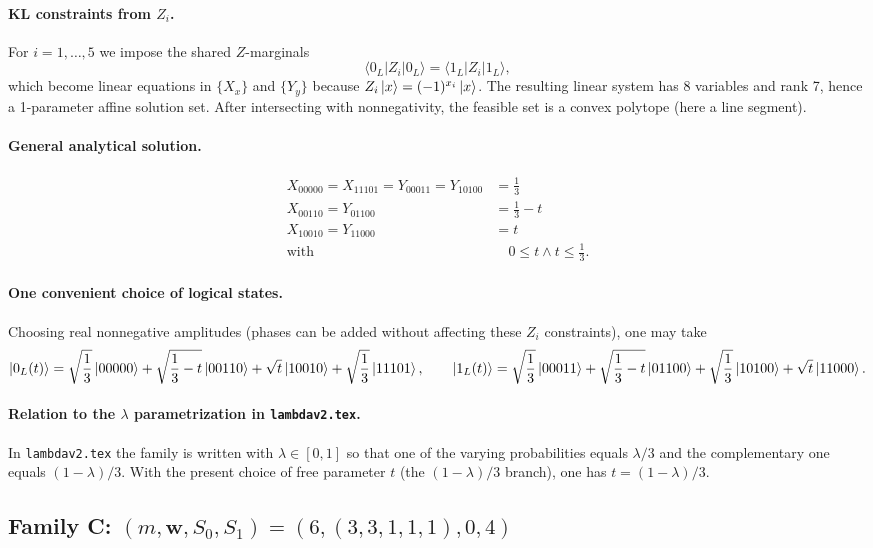 \documentclass[11pt]{article}
\begin{document}
\paragraph{KL constraints from $Z_i$.}
For $i=1,\dots,5$ we impose the shared $Z$-marginals
\[
\langle 0_L|Z_i|0_L\rangle=\langle 1_L|Z_i|1_L\rangle,
\]
which become linear equations in $\{X_x\}$ and $\{Y_y\}$ because $Z_i\ket{x}=(-1)^{x_i}\ket{x}$.
The resulting linear system has 8 variables and rank 7, hence a 1-parameter affine solution set. After intersecting with nonnegativity, the feasible set is a convex polytope (here a line segment).

\paragraph{General analytical solution.}
\[
\begin{aligned}
X_{00000} = X_{11101} = Y_{00011} = Y_{10100} &= \frac{1}{3}\\
X_{00110} = Y_{01100} &= \frac{1}{3} - t\\
X_{10010} = Y_{11000} &= t\\
\text{with }&\quad 0 \leq t \wedge t \leq \frac{1}{3}.
\end{aligned}
\]
\paragraph{One convenient choice of logical states.}
Choosing real nonnegative amplitudes (phases can be added without affecting these $Z_i$ constraints), one may take
\[
\ket{0_L(t)} = \sqrt{\frac{1}{3}}\ket{00000} + \sqrt{\frac{1}{3} - t}\ket{00110} + \sqrt{t}\ket{10010} + \sqrt{\frac{1}{3}}\ket{11101},\qquad \ket{1_L(t)} = \sqrt{\frac{1}{3}}\ket{00011} + \sqrt{\frac{1}{3} - t}\ket{01100} + \sqrt{\frac{1}{3}}\ket{10100} + \sqrt{t}\ket{11000}.
\]
\paragraph{Relation to the $\lambda$ parametrization in \texttt{lambdav2.tex}.}
In \texttt{lambdav2.tex} the family is written with $\lambda\in[0,1]$ so that one of the varying probabilities equals $\lambda/3$ and the complementary one equals $(1-\lambda)/3$. With the present choice of free parameter $t$ (the $(1-\lambda)/3$ branch), one has $t=(1-\lambda)/3$.


\subsection{Family C: $(m,\mathbf w,S_0,S_1)=(6,(3,3,1,1,1),0,4)$}
\end{document}
